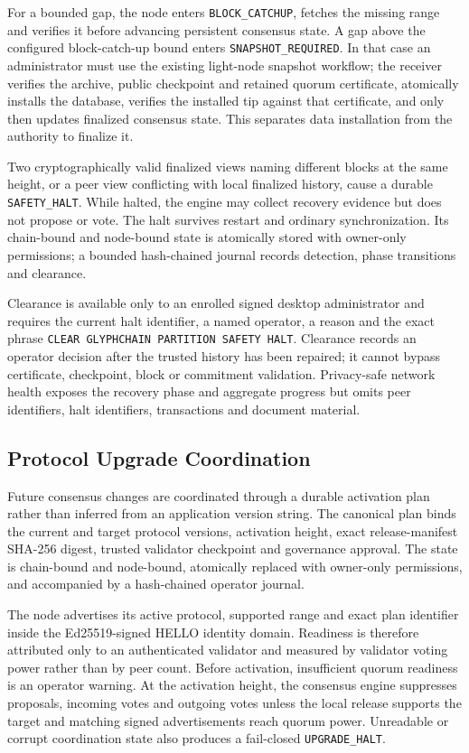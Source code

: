 For a bounded gap, the node enters \texttt{BLOCK\_CATCHUP}, fetches the missing
range and verifies it before advancing persistent consensus state.  A gap above
the configured block-catch-up bound enters
\texttt{SNAPSHOT\_REQUIRED}.  In that case an administrator must use the
existing light-node snapshot workflow; the receiver verifies the archive,
public checkpoint and retained quorum certificate, atomically installs the
database, verifies the installed tip against that certificate, and only then
updates finalized consensus state.  This separates data installation from the
authority to finalize it.

Two cryptographically valid finalized views naming different blocks at the
same height, or a peer view conflicting with local finalized history, cause a
durable \texttt{SAFETY\_HALT}.  While halted, the engine may collect recovery
evidence but does not propose or vote.  The halt survives restart and ordinary
synchronization.  Its chain-bound and node-bound state is atomically stored
with owner-only permissions; a bounded hash-chained journal records detection,
phase transitions and clearance.

Clearance is available only to an enrolled signed desktop administrator and
requires the current halt identifier, a named operator, a reason and the exact
phrase \texttt{CLEAR GLYPHCHAIN PARTITION SAFETY HALT}.  Clearance records an
operator decision after the trusted history has been repaired; it cannot bypass
certificate, checkpoint, block or commitment validation.  Privacy-safe network
health exposes the recovery phase and aggregate progress but omits peer
identifiers, halt identifiers, transactions and document material.

\subsection{Protocol Upgrade Coordination}

Future consensus changes are coordinated through a durable activation plan
rather than inferred from an application version string.  The canonical plan
binds the current and target protocol versions, activation height, exact
release-manifest SHA-256 digest, trusted validator checkpoint and governance
approval.  The state is chain-bound and node-bound, atomically replaced with
owner-only permissions, and accompanied by a hash-chained operator journal.

The node advertises its active protocol, supported range and exact plan
identifier inside the Ed25519-signed HELLO identity domain.  Readiness is
therefore attributed only to an authenticated validator and measured by
validator voting power rather than by peer count.  Before activation,
insufficient quorum readiness is an operator warning.  At the activation
height, the consensus engine suppresses proposals, incoming votes and outgoing
votes unless the local release supports the target and matching signed
advertisements reach quorum power.  Unreadable or corrupt coordination state
also produces a fail-closed \texttt{UPGRADE\_HALT}.

